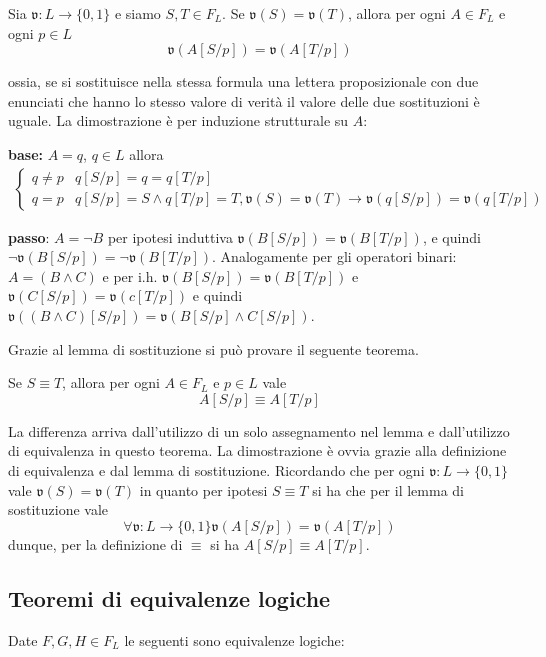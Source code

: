 \begin{lem}[di sostituzione]
Sia $\mathfrak{v}: L \rightarrow \{0,1\}$ e siamo $S,T \in F_L$. 
Se $\mathfrak{v}(S) = \mathfrak{v}(T)$,  allora per ogni $A \in F_L$ e ogni $p \in L$
$$
\mathfrak{v}(A[S/p]) = \mathfrak{v}(A[T/p])
$$ 
\end{lem}
ossia, se si sostituisce nella stessa formula una lettera proposizionale 
con due enunciati che hanno lo stesso valore di verità il valore delle due 
sostituzioni è uguale. La dimostrazione è per induzione strutturale su $A$: 
\newline 

\textbf{base:} $ A = q$, $q \in L$ allora 
\begin{align*}
  \begin{cases}
    q \neq p & q[S/p] = q = q[T/p] \\
    q = p & q[S/p] = S \land q [T/p] = T, \mathfrak{v}(S) = \mathfrak{v}(T) \rightarrow \mathfrak{v}(q[S/p]) = \mathfrak{v}(q[T/p])
  \end{cases}
\end{align*}
\newline 

\textbf{passo}: $A= \neg B$ per ipotesi induttiva $\mathfrak{v}(B[S/p]) = \mathfrak{v}(B[T/p])$, 
e quindi $\neg \mathfrak{v}(B[S/p]) = \neg \mathfrak{v}(B[T/p])$. Analogamente per gli 
operatori binari: 
$A = (B \land C)$ e per i.h. $\mathfrak{v}(B[S/p]) = \mathfrak{v}(B[T/p])$ e $\mathfrak{v}(C[S/p]) = \mathfrak{v}(c[T/p])$ 
e quindi $\mathfrak{v}((B\land C)[S/p]) = \mathfrak{v}(B[S/p] \land C[S/p])$. 

Grazie al lemma di sostituzione si può provare il seguente teorema. 
\begin{teo}[di sostituzione]
Se $S \equiv T$, allora per ogni $A \in F_L$ e $p \in L$ vale 
$$ 
A[S/p] \equiv A[T/p]
$$ 
\end{teo}
La differenza arriva dall'utilizzo di un solo assegnamento nel lemma e 
dall'utilizzo di equivalenza in questo teorema. 
La dimostrazione è ovvia grazie alla definizione di equivalenza e dal 
lemma di sostituzione. Ricordando che per ogni $\mathfrak{v}: L \rightarrow \{0,1\}$ vale 
$\mathfrak{v}(S) = \mathfrak{v}(T)$ in quanto per ipotesi $S \equiv T$ si ha che 
per il lemma di sostituzione vale 
$$
\forall \mathfrak{v}: L \rightarrow \{0,1\} \mathfrak{v}(A[S/p]) = \mathfrak{v}(A[T/p])
$$ 
dunque, per la definizione di $\equiv$ si ha $A[S/p] \equiv A[T/p]$. 


\noindent 
\subsection{Teoremi di equivalenze logiche}
Date $F, G, H \in F_L$ le seguenti sono equivalenze logiche: 

